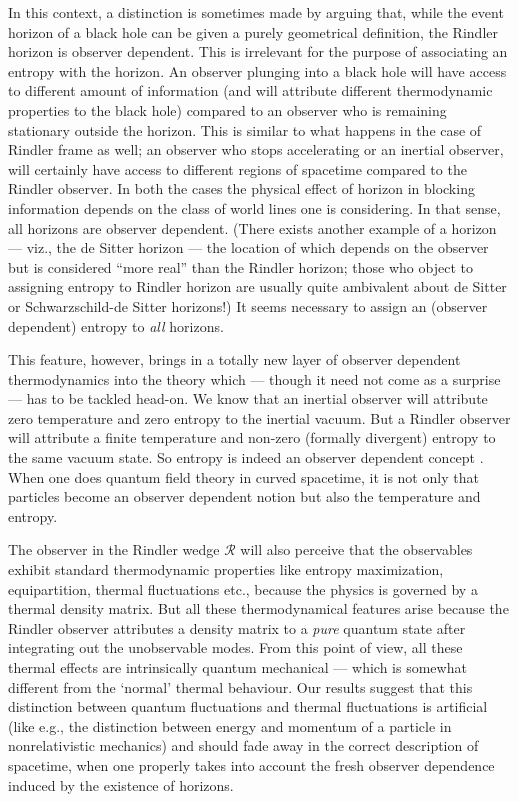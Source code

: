 \documentclass[12pt]{iopart}
\begin{document}
In this context, a distinction is sometimes made by arguing  that, while the event horizon of a black hole can be given a purely geometrical definition,  the Rindler horizon is observer dependent.
This  is irrelevant for the purpose of associating an entropy with the horizon.
An observer plunging into a black hole will have access to different amount of information (and  will attribute different thermodynamic properties to the black hole) compared to an observer who is remaining stationary outside the horizon. This is similar to what happens in the case of Rindler frame as well; an observer who stops accelerating or an inertial observer, will certainly have access to different regions of spacetime compared to the Rindler observer. In both the cases the physical effect of horizon in blocking information depends on the class of world lines one is considering. In that sense, all horizons are observer dependent. (There exists another example of a horizon --- viz., the de Sitter horizon --- the location of which depends on the observer but is considered ``more real'' than the Rindler horizon; those who object to assigning entropy to Rindler horizon are usually quite ambivalent about de Sitter
or Schwarzschild-de Sitter  \cite{tirthtpgrg} horizons!)
It seems necessary to assign an (observer dependent) entropy to \textit{all} horizons.

This feature, however, brings in a totally new layer of observer dependent  thermodynamics into the theory which
--- though it  need not come as a surprise ---
has to be tackled head-on. 
We know that an inertial observer will attribute
  zero temperature and zero entropy to the inertial vacuum. But a Rindler observer will attribute a finite temperature and non-zero (formally divergent) entropy to the same vacuum state. So entropy is indeed an observer dependent concept \cite{marolf}. When one does  quantum field theory in curved spacetime, it is 
  not only that particles become an observer dependent notion but also the  temperature and entropy. 
  
 The observer in the Rindler wedge $\mathcal{R}$ will also perceive  that the observables exhibit standard thermodynamic properties like entropy maximization, equipartition, thermal fluctuations etc., because the physics is governed by a thermal density matrix. But all these thermodynamical features arise because the  Rindler observer attributes a density matrix to a \textit{pure} quantum state after integrating out the unobservable modes. From this point of view, all these thermal effects are intrinsically quantum mechanical --- which is somewhat different from the `normal' thermal behaviour.  Our results suggest that this distinction between quantum fluctuations and thermal fluctuations is artificial (like e.g., the distinction between energy and momentum of a particle in nonrelativistic mechanics) and should fade away in the correct description of spacetime, when one properly takes into account the fresh observer dependence induced by the existence of  horizons.   
\end{document}

